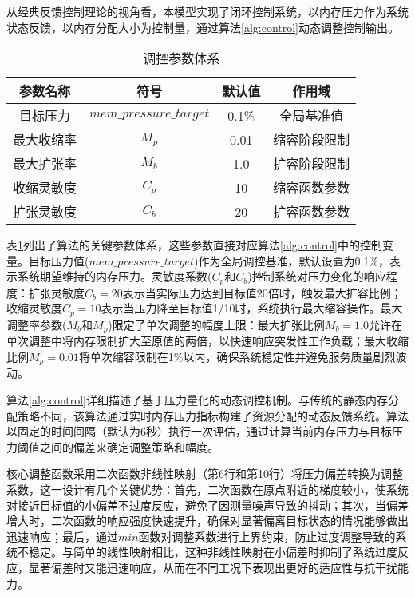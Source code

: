 从经典反馈控制理论的视角看，本模型实现了闭环控制系统，以内存压力作为系统状态反馈，以内存分配大小为控制量，通过算法\ref{alg:control}动态调整控制输出。

\begin{table}[H]
\centering
\caption{调控参数体系}
\label{tab:params}
\begin{tabular}{cccc}
\toprule
参数名称 & 符号 & 默认值 & 作用域 \\
\midrule
目标压力 & \(mem\_pressure\_target\) & 0.1\% & 全局基准值 \\
最大收缩率 & \(M_p\) & 0.01 & 缩容阶段限制 \\
最大扩张率 & \(M_b\) & 1.0 & 扩容阶段限制 \\
收缩灵敏度 & \(C_p\) & 10 & 缩容函数参数 \\
扩张灵敏度 & \(C_b\) & 20 & 扩容函数参数 \\
\bottomrule
\end{tabular}
\end{table}

表\ref{tab:params}列出了算法的关键参数体系，这些参数直接对应算法\ref{alg:control}中的控制变量。目标压力值(\(mem\_pressure\_target\))作为全局调控基准，默认设置为0.1\%，表示系统期望维持的内存压力。灵敏度系数(\(C_p\)和\(C_b\))控制系统对压力变化的响应程度：扩张灵敏度\(C_b = 20\)表示当实际压力达到目标值20倍时，触发最大扩容比例；收缩灵敏度\(C_p = 10\)表示当压力降至目标值1/10时，系统执行最大缩容操作。最大调整率参数(\(M_b\)和\(M_p\))限定了单次调整的幅度上限：最大扩张比例\(M_b = 1.0\)允许在单次调整中将内存限制扩大至原值的两倍，以快速响应突发性工作负载；最大收缩比例\(M_p = 0.01\)将单次缩容限制在1\%以内，确保系统稳定性并避免服务质量剧烈波动。

算法\ref{alg:control}详细描述了基于压力量化的动态调控机制。与传统的静态内存分配策略不同，该算法通过实时内存压力指标构建了资源分配的动态反馈系统。算法以固定的时间间隔（默认为6秒）执行一次评估，通过计算当前内存压力与目标压力阈值之间的偏差来确定调整策略和幅度。

核心调整函数采用二次函数非线性映射（第6行和第10行）将压力偏差转换为调整系数，这一设计有几个关键优势：首先，二次函数在原点附近的梯度较小，使系统对接近目标值的小偏差不过度反应，避免了因测量噪声导致的抖动；其次，当偏差增大时，二次函数的响应强度快速提升，确保对显著偏离目标状态的情况能够做出迅速响应；最后，通过\(min\)函数对调整系数进行上界约束，防止过度调整导致的系统不稳定。与简单的线性映射相比，这种非线性映射在小偏差时抑制了系统过度反应，显著偏差时又能迅速响应，从而在不同工况下表现出更好的适应性与抗干扰能力。

